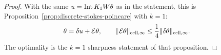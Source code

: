 \begin{proof}
With the same $u=\operatorname{Int} K_1W\theta$ as in the statement, this is
Proposition~\ref{prop:discrete-stokes-poincare} with $k=1$:
\[
\theta=\delta u+\mathcal E\theta,
\qquad
\lVert \mathcal E\theta \rVert_{\mathrm{cell},\infty}
\le\frac14\lVert \delta\theta \rVert_{\mathrm{cell},\infty}.
\]
The optimality is the $k=1$ sharpness statement of that proposition.
\end{proof}


